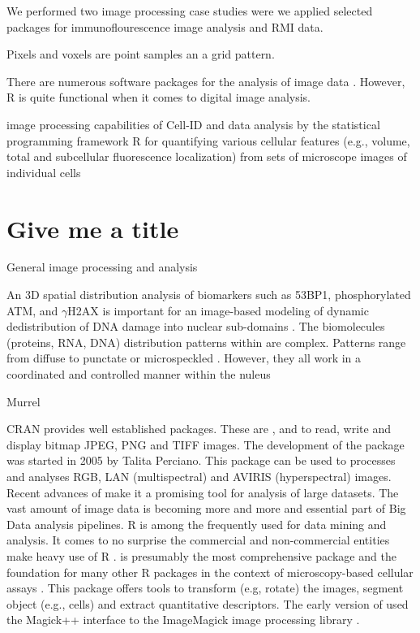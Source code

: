 We performed two image processing case studies were we applied selected 
packages for immunoflourescence image analysis and RMI data. 

Pixels and voxels are point samples an a grid pattern.

There are numerous software packages for the analysis of image data 
\citep{wiesmann_review_2015}. However, R is quite functional when it comes to 
digital image analysis.

image processing capabilities of Cell-ID and data analysis by the statistical 
programming framework R for quantifying various cellular features (e.g., volume, 
total and subcellular fluorescence localization) from sets of microscope 
images of individual cells \citep{bush_using_2012}


\section{Give me a title}

General image processing and analysis \citep{ljosa_introduction_2009}

An 3D spatial distribution analysis of biomarkers such as 53BP1, phosphorylated 
ATM, and $\gamma$H2AX  is important for an image-based modeling of dynamic 
dedistribution of DNA damage into nuclear sub-domains 
\citep{costes_image-based_2007}. The biomolecules (proteins, RNA, DNA) distribution patterns within are complex. 
Patterns range from diffuse to punctate or microspeckled 
\citep{shiels_quantitative_2007, willitzki_new_2012}. However, they all work in a coordinated and controlled 
manner within the nuleus \citep{shiels_quantitative_2007}


\citep{tabelow_modeling_2012, tabelow_dti:_2014}

Murrel \citep{murrell_raster_2011}
 \citep{clayden_mmand:_2016}

CRAN provides well established packages. These are ,  
and  to read, write and display bitmap JPEG, PNG and TIFF images. 
The development of the  \citep{perciano_ripa:_2014} package was 
started in 2005 by Talita Perciano. This package can be used to processes and 
analyses RGB, LAN (multispectral) and AVIRIS (hyperspectral) images. Recent 
advances of  make it a promising tool for analysis of large 
datasets. The vast amount of image data is becoming more and more and essential 
part of Big Data analysis pipelines. R is among the frequently used for data 
mining and analysis. It comes to no surprise the commercial and non-commercial 
entities make heavy use of R \citep{chen_big_2014}.  
\citep{pau_ebimager_2010} is presumably the most comprehensive package and the 
foundation for many other R packages in the context of microscopy-based cellular 
assays \citep{gowen_near_2015}. This package offers tools to transform (e.g, 
rotate) the images, segment object (e.g., cells) and extract quantitative 
descriptors. The early version of  used the Magick++ interface 
to the ImageMagick image processing library \citep{sklyar_image_2006}.

